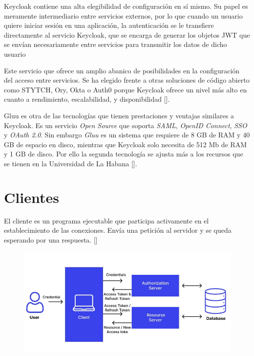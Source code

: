 Keycloak contiene una alta elegibilidad de configuración en sí mismo. Su papel
es meramente intermediario entre servicios externos, por lo que cuando un
usuario quiere iniciar sesión en una aplicación, la autenticación se le transfiere
directamente al servicio Keycloak, que se encarga de generar los objetos JWT
que se envían necesariamente entre servicios para transmitir los datos de dicho
usuario

Este servicio que ofrece un amplio abanico de posibilidades en la configuración del acceso entre servicios. Se ha elegido frente a otras soluciones de código abierto como STYTCH, Ory, Okta o Auth0 porque Keycloak ofrece un nivel más alto en cuanto a rendimiento, escalabilidad, y disponibilidad [\cite{lobato2022regulacion}]. 

Gluu es otra de las tecnologías que tienen prestaciones y ventajas similares a Keycloak. Es un servicio \textit{Open Source} que soporta \textit{SAML}, \textit{OpenID Connect}, \textit{SSO} y \textit{OAuth 2.0}. Sin embargo \textit{Gluu} es un sistema que requiere de 8 GB de RAM y 40 GB de espacio en disco, mientras que Keycloak solo necesita de 512 Mb de RAM y 1 GB de disco. Por ello la segunda tecnología se ajusta más a los recursos que se tienen en la Universidad de La Habana [\cite{vassallo2017continuous}].


\section*{Clientes}
El cliente es un programa ejecutable que participa activamente en el establecimiento de las conexiones. Envía una petición al servidor y se queda esperando por una respuesta. [\cite{lizama2016redes}]

\begin{figure}[H]
	\centering
	\includegraphics[width=0.9\linewidth]{Graphics/token-based-auth}
	\caption{}
	\label{fig:token-based-auth}
\end{figure}


